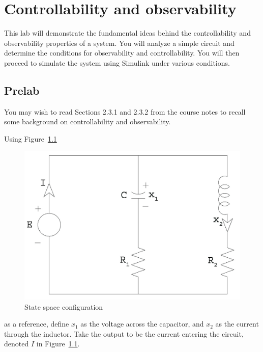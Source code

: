 \chapter{Controllability and observability}\label{chap:controlandobserve}

This lab will demonstrate the fundamental ideas behind the controllability
and observability properties of a system.  You will analyze a simple circuit
and determine the conditions for observability and controllability.  You will
then proceed to simulate the system using \textsf{Simulink} under various
conditions.

\section{Prelab}

You may wish to read Sections 2.3.1 and 2.3.2 from the
course notes to recall some background on controllability and observability.

Using Figure~\ref{fig:circuit}
\begin{figure}[htbp]
    \centering
    \includegraphics[width=0.6\hsize]{pix/circuitlarge.jpg}
    \caption{State space configuration}\label{fig:circuit}
\end{figure}
as a reference, define \(x_{1}\) as the voltage across the capacitor, and
\(x_{2}\) as the current through the inductor.  Take the output to be the
current entering the circuit, denoted \(I\) in Figure~\ref{fig:circuit}.

